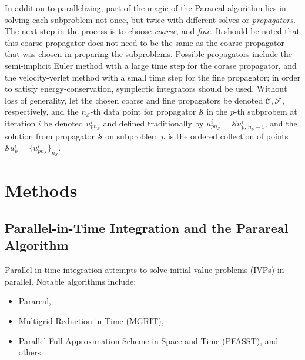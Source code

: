 			In addition to parallelizing, part of the magic of the Parareal algorithm lies in solving each subproblem not once, but twice with different solves or \emph{propagators}.  The next step in the process is to choose \emph{coarse}, and \emph{fine}. It should be noted that this coarse propagator does not need to be the same as the coarse propagator that was chosen in preparing the subproblems.  Possible propagators include the semi-implicit Euler method with a large time step for the corase propagator, and the velocity-verlet method with a small time step for the fine propagator; in order to satisfy energy-conservation, symplectic integrators should be used.  Without loss of generality, let the chosen coarse and fine propagators be denoted $\mathcal{C}, \mathcal{F}$, respectively, and the $n_\mathcal{S}$-th data point for propagator $\mathcal{S}$ in the $p$-th subprobem at iteration $i$ be denoted $u_{p n_\mathcal{S}}^i$ and defined traditionally by $u_{p n_\mathcal{S}}^i = \mathcal{S} u_{p, \, n_\mathcal{S} - 1}^i$, and the solution from propagator $\mathcal{S}$ on subproblem $p$ is the ordered collection of points $\mathcal{S} u_p^i = \{ u_{p n_\mathcal{S}}^i \}_{n_\mathcal{S}}$.

\section*{Methods}
\subsection*{Parallel-in-Time Integration and the Parareal Algorithm}
Parallel-in-time integration attempts to solve initial value problems (IVPs) in parallel. Notable algorithms include:
\begin{itemize}
    \item Parareal,
    \item Multigrid Reduction in Time (MGRIT),
    \item Parallel Full Approximation Scheme in Space and Time (PFASST), and others.
\end{itemize}

